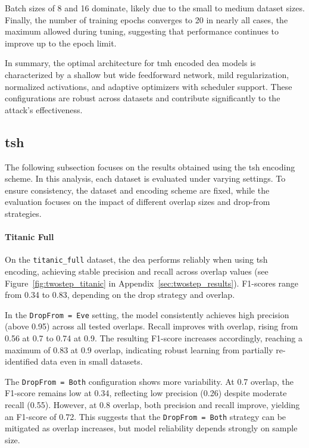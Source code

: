 Batch sizes of 8 and 16 dominate, likely due to the small to medium dataset sizes.
Finally, the number of training epochs converges to 20 in nearly all cases, the maximum allowed during tuning, suggesting that performance continues to improve up to the epoch limit.

In summary, the optimal architecture for \ac{tmh} encoded \ac{dea} models is characterized by a shallow but wide feedforward network, mild regularization, normalized activations, and adaptive optimizers with scheduler support.
These configurations are robust across datasets and contribute significantly to the attack's effectiveness.

\subsection{\ac{tsh}}

The following subsection focuses on the results obtained using the \ac{tsh} encoding scheme.
In this analysis, each dataset is evaluated under varying settings.
To ensure consistency, the dataset and encoding scheme are fixed, while the evaluation focuses on the impact of different overlap sizes and drop-from strategies.

\paragraph{Titanic Full}

On the \texttt{titanic\_full} dataset, the \ac{dea} performs reliably when using \ac{tsh} encoding, achieving stable precision and recall across overlap values (see Figure~\ref{fig:twostep_titanic} in Appendix~\ref{sec:twostep_results}).
F1-scores range from 0.34 to 0.83, depending on the drop strategy and overlap.

In the \texttt{DropFrom = Eve} setting, the model consistently achieves high precision (above 0.95) across all tested overlaps.
Recall improves with overlap, rising from 0.56 at 0.7 to 0.74 at 0.9.
The resulting F1-score increases accordingly, reaching a maximum of 0.83 at 0.9 overlap, indicating robust learning from partially re-identified data even in small datasets.

The \texttt{DropFrom = Both} configuration shows more variability.
At 0.7 overlap, the F1-score remains low at 0.34, reflecting low precision (0.26) despite moderate recall (0.55).
However, at 0.8 overlap, both precision and recall improve, yielding an F1-score of 0.72.
This suggests that the \texttt{DropFrom = Both} strategy can be mitigated as overlap increases, but model reliability depends strongly on sample size.

